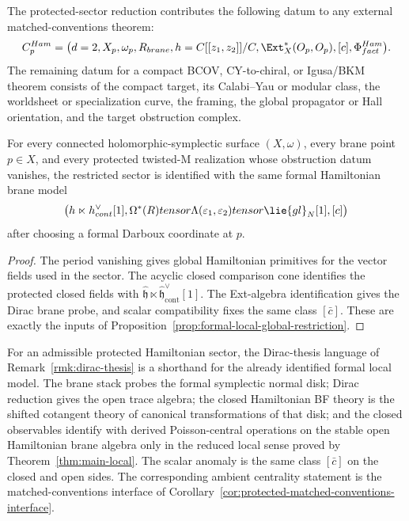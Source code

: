 \begin{defn}\label{defn:protected-sector-matched-conventions-contribution}
  The protected-sector reduction contributes the following datum to any
  external matched-conventions theorem:
  \[
  \mathfrak C_{\widehat p}^{\mathrm{Ham}}=
  \bigl(
    d=2,\widehat X_p,\omega_p,
    \R_{\mathrm{brane}},
    \widehat{\mathfrak h}=\C[[z_1,z_2]]/\C,
    \Ext_X^*(\mc O_p,\mc O_p),
    [\bar c],
    \Phi^{\mathrm{Ham}}_{\mathrm{fact}}
  \bigr).
  \]
  The remaining datum for a compact BCOV, CY-to-chiral, or Igusa/BKM
  theorem consists of the compact target, its Calabi--Yau or modular
  class, the worldsheet or specialization curve, the framing, the global
  propagator or Hall orientation, and the target obstruction complex.
\end{defn}

\begin{cor}\label{cor:protected-formal-uniformity}
  For every connected holomorphic-symplectic surface \((X,\omega)\), every
  brane point \(p\in X\), and every protected twisted-M realization whose
  obstruction datum vanishes, the restricted sector is identified with the
  same formal Hamiltonian brane model
  \[
    \bigl(\widehat{\mathfrak h}\ltimes
    \widehat{\mathfrak h}^{\vee}_{\mathrm{cont}}[1],
    \Omega^*(\R)\otimes\Lambda(\varepsilon_1,\varepsilon_2)
      \otimes\lie{gl}_N[1],
    [\bar c]\bigr)
  \]
  after choosing a formal Darboux coordinate at \(p\).
\end{cor}

\begin{proof}
  The period vanishing gives global Hamiltonian primitives for the vector
  fields used in the sector.  The acyclic closed comparison cone identifies
  the protected closed fields with
  \(\widehat{\mathfrak h}\ltimes
  \widehat{\mathfrak h}^{\vee}_{\mathrm{cont}}[1]\).  The Ext-algebra
  identification gives the Dirac brane probe, and scalar compatibility
  fixes the same class \([\bar c]\).  These are exactly the inputs of
  Proposition~\ref{prop:formal-local-global-restriction}.
\end{proof}

\begin{rmk}
  For an admissible protected Hamiltonian sector, the Dirac-thesis
  language of Remark~\ref{rmk:dirac-thesis} is a shorthand for the
  already identified formal local model.  The brane stack probes the
  formal symplectic normal disk; Dirac reduction gives the open trace
  algebra; the closed Hamiltonian BF theory is the shifted cotangent
  theory of canonical transformations of that disk; and the closed
  observables identify with derived Poisson-central operations on the
  stable open Hamiltonian brane algebra only in the reduced local sense
  proved by Theorem~\ref{thm:main-local}.  The scalar anomaly is the
  same class $[\bar c]$ on the closed and open sides.  The corresponding
  ambient centrality statement is the matched-conventions interface of
  Corollary~\ref{cor:protected-matched-conventions-interface}.
\end{rmk}

